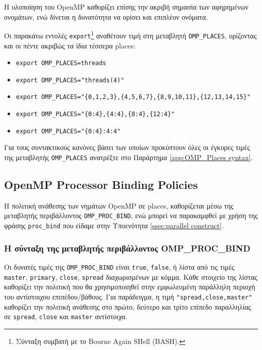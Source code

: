 Η υλοποίηση του OpenMP καθορίζει επίσης την ακριβή σημασία των αφηρημένων ονομάτων, ενώ δίνεται η δυνατότητα να ορίσει και επιπλέον ονόματα.

Οι παρακάτω εντολές \texttt{export}\footnote{Σύνταξη συμβατή με το Bourne Again SHell (BASH).} αναθέτουν τιμή στη μεταβλητή \texttt{OMP\_PLACES}, ορίζοντας και οι πέντε ακριβώς τα ίδια τέσσερα places:
\begin{itemize}
	\item \texttt{export OMP\_PLACES=threads}
	\item \texttt{export OMP\_PLACES="threads(4)"}
	\item \texttt{export OMP\_PLACES="\{0,1,2,3\},\{4,5,6,7\},\{8,9,10,11\},\{12,13,14,15\}"}
	\item \texttt{export OMP\_PLACES="\{0:4\},\{4:4\},\{8:4\},\{12:4\}"}
	\item \texttt{export OMP\_PLACES="\{0:4\}:4:4"}
\end{itemize}

Για τους συντακτικούς κανόνες βάσει των οποίων προκύπτουν όλες οι έγκυρες τιμές της μεταβλητής \texttt{OMP\_PLACES} ανατρέξτε στο Παράρτημα \ref{app:OMP_Places syntax}.


\subsection{OpenMP Processor Binding Policies}
\label{ssec:Processor binding policies}

Η πολιτική ανάθεσης των νημάτων OpenMP σε places, καθορίζεται μέσω της μεταβλητής περιβάλλοντος \texttt{OMP\_PROC\_BIND}, ενώ μπορεί να παρακαμφθεί με χρήση της φράσης \texttt{proc\_bind} που είδαμε στην Υποενότητα \ref{ssec:parallel construct}.



\subsubsection{Η σύνταξη της μεταβλητής περιβάλλοντος OMP\_PROC\_BIND}
\label{ssec:OMP_PROC_BIND syntax}

Οι δυνατές τιμές της \texttt{OMP\_PROC\_BIND} είναι \texttt{true}, \texttt{false}, ή λίστα από τις τιμές \texttt{master}, \texttt{primary}, \texttt{close}, \texttt{spread} διαχωρισμένων με κόμμα. Κάθε στοιχείο της λίστας καθορίζει την πολιτική που θα χρησιμοποιηθεί στην εμφωλευμένη παράλληλη περιοχή του αντίστοιχου επιπέδου/βάθους. Για παράδειγμα, η τιμή \texttt{"spread,close,master"} καθορίζει την πολιτική ανάθεσης στο πρώτο, δεύτερο και τρίτο επίπεδο παραλληλίας σε \texttt{spread}, \texttt{close} και \texttt{master} αντίστοιχα.

